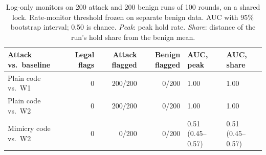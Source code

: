 \begin{table}[!t]
\centering\footnotesize
\caption{Log-only monitors on 200 attack and 200 benign runs of 100 rounds, on a shared lock. Rate-monitor threshold frozen on separate benign data. AUC with 95\% bootstrap interval; 0.50 is chance. \emph{Peak}: peak hold rate. \emph{Share}: distance of the run's hold share from the benign mean.}
\label{tab:monitors}
\setlength{\tabcolsep}{3pt}
\begin{tabularx}{\textwidth}{@{}Y r r r l l@{}}
\toprule
\textbf{Attack vs.\ baseline} & \textbf{Legal flags} & \textbf{Attack flagged} & \textbf{Benign flagged} & \textbf{AUC, peak} & \textbf{AUC, share}\\
\midrule
Plain code vs.\ W1 & 0 & 200/200 & 0/200 & 1.00 & 1.00 \\
Plain code vs.\ W2 & 0 & 200/200 & 0/200 & 1.00 & 1.00 \\
Mimicry code vs.\ W2 & 0 & 0/200 & 0/200 & 0.51 (0.45--0.57) & 0.51 (0.45--0.57) \\
\bottomrule
\end{tabularx}
\end{table}
